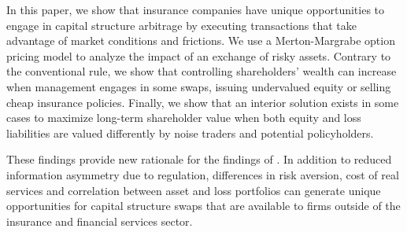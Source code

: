 In this paper, we show that insurance companies have unique opportunities to engage in capital structure arbitrage by executing transactions that take advantage of market conditions and frictions. We use a Merton-Margrabe option pricing model to analyze the impact of an exchange of risky assets.  Contrary to the conventional rule, we show that controlling shareholders' wealth can increase when management engages in some swaps, issuing undervalued equity or selling cheap insurance policies. Finally, we show that an interior solution exists in some cases to maximize long-term shareholder value when both equity and loss liabilities are valued differently by noise traders and potential policyholders. 

These findings provide new rationale for the findings of \citet{akhigbe1997a}.  In addition to reduced information asymmetry due to regulation, differences in risk aversion, cost of real services and correlation between asset and loss portfolios can generate unique opportunities for capital structure swaps that are available to firms outside of the insurance and financial services sector.